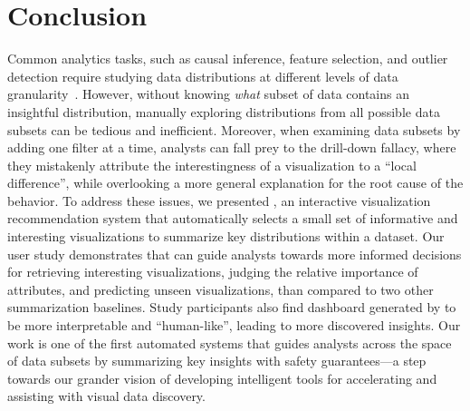 \section{Conclusion}
\par Common analytics tasks, such as causal inference, feature selection, and outlier detection require studying data distributions at different levels of data granularity~\cite{Anand2015,Heer2012,Wu2013,Hullman2017}. However, without knowing \textit{what} subset of data contains an insightful distribution, manually exploring distributions from all possible data subsets can be tedious and inefficient. Moreover, when examining data subsets by adding one filter at a time, analysts can fall prey to the drill-down fallacy, where they mistakenly attribute the interestingness of a visualization to a ``local difference'', while overlooking a more general explanation for the root cause of the behavior. To address these issues, we presented \system, an interactive visualization recommendation system that automatically selects a small set of informative and interesting visualizations to summarize key distributions within a dataset. Our user study demonstrates that \system can guide analysts towards more informed decisions for retrieving interesting visualizations, judging the relative importance of attributes, and predicting unseen visualizations, than compared to two other summarization baselines. Study participants also find dashboard generated by \system to be more interpretable and ``human-like'', leading to more discovered insights. Our work is one of the first automated systems that guides analysts across the space of data subsets by summarizing key insights with safety guarantees---a step towards our grander vision of developing intelligent tools for accelerating and assisting with visual data discovery.  
